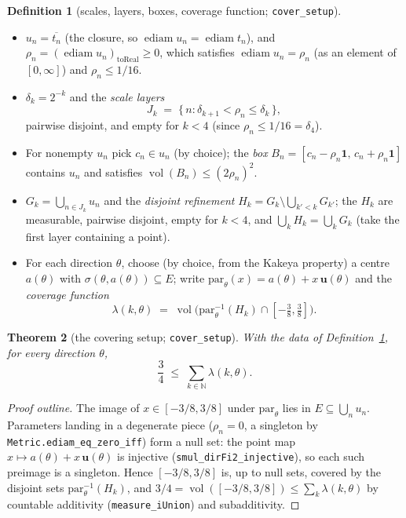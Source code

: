 \documentclass[11pt,a4paper]{article}
\newcommand{\N}{\mathbb{N}}
\newcommand{\ennr}{\ensuremath{[0,\infty]}}          %
\newcommand{\vol}{\operatorname{vol}}                %
\DeclareMathOperator{\ediam}{ediam}
\newcommand{\dir}{\mathbf{u}}                        %
\newcommand{\tseg}{\sigma}                           %
\newcommand{\lname}[1]{\texttt{#1}}                  %
\newtheorem{theorem}{Theorem}[section]
\theoremstyle{definition}
\newtheorem{definition}[theorem]{Definition}
\theoremstyle{remark}
\begin{document}
\begin{definition}[{scales, layers, boxes, coverage function;
\lname{cover\_setup}}]\ \label{def:cover-setup}
\begin{itemize}
\item $u_n=\overline{t_n}$ (the closure, so $\ediam u_n=\ediam t_n$), and
$\rho_n = (\ediam u_n)_{\mathrm{toReal}}\ge 0$, which satisfies
$\ediam u_n = \rho_n$ (as an element of $\ennr$) and $\rho_n\le 1/16$.
\item $\delta_k = 2^{-k}$ and the \emph{scale layers}
\[
   J_k \;=\; \{\, n : \delta_{k+1}<\rho_n\le \delta_k \,\},
\]
pairwise disjoint, and empty for $k<4$ (since $\rho_n\le1/16=\delta_4$).
\item For nonempty $u_n$ pick $c_n\in u_n$ (by choice); the \emph{box}
$B_n=[c_n-\rho_n\mathbf{1},\,c_n+\rho_n\mathbf{1}]$ contains $u_n$ and satisfies
$\vol(B_n)\le (2\rho_n)^2$.
\item $G_k=\bigcup_{n\in J_k} u_n$ and the \emph{disjoint refinement}
$H_k = G_k\setminus\bigcup_{k'<k}G_{k'}$; the $H_k$ are measurable, pairwise disjoint,
empty for $k<4$, and $\bigcup_k H_k=\bigcup_k G_k$ (take the first layer containing a
point).
\item For each direction $\theta$, choose (by choice, from the Kakeya property) a centre
$a(\theta)$ with $\tseg(\theta,a(\theta))\subseteq E$; write
$\mathrm{par}_\theta(x)=a(\theta)+x\,\dir(\theta)$ and the \emph{coverage function}
\[
  \lambda(k,\theta)
  \;=\; \vol\bigl(\mathrm{par}_\theta^{-1}(H_k)\cap[-\tfrac38,\tfrac38]\bigr).
\]
\end{itemize}
\end{definition}

\begin{theorem}[{the covering setup; \lname{cover\_setup}}]
\label{thm:cover-setup}
With the data of Definition~\ref{def:cover-setup}, for every direction $\theta$,
\[
  \frac34 \;\le\; \sum_{k\in\N} \lambda(k,\theta) .
\]
\end{theorem}

\begin{proof}[Proof outline]
The image of $x\in[-3/8,3/8]$ under $\mathrm{par}_\theta$ lies in
$E\subseteq\bigcup_n u_n$.  Parameters landing in a degenerate piece ($\rho_n=0$, a
singleton by \lname{Metric.ediam\_eq\_zero\_iff}) form a null set: the point map
$x\mapsto a(\theta)+x\,\dir(\theta)$ is injective (\lname{smul\_dirFi2\_injective}), so
each such preimage is a singleton.  Hence $[-3/8,3/8]$ is, up to null sets, covered by
the disjoint sets $\mathrm{par}_\theta^{-1}(H_k)$, and
$3/4 = \vol([-3/8,3/8])\le \sum_k\lambda(k,\theta)$ by countable additivity
(\lname{measure\_iUnion}) and subadditivity.
\end{proof}
\end{document}
